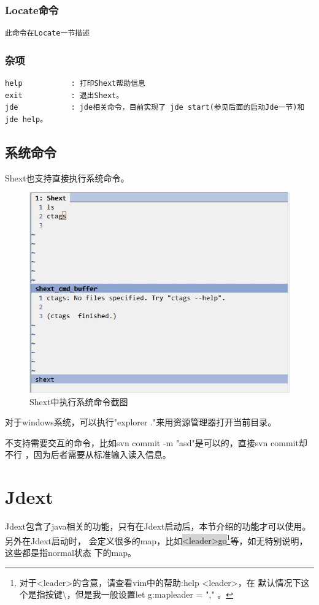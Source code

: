 \documentclass[oneside,openany]{book}
\begin{document}
\subsubsection{Locate命令}
\begin{verbatim}
此命令在Locate一节描述
\end{verbatim}

\subsubsection{杂项}
\begin{verbatim}
help           : 打印Shext帮助信息
exit           : 退出Shext。
jde            : jde相关命令，目前实现了 jde start(参见后面的启动Jde一节)和jde help。
\end{verbatim}

\subsection{系统命令}
  Shext也支持直接执行系统命令。
  \FloatBarrier
  \begin{figure}[H]%
  \centering
  \includegraphics[scale=0.5]{shext-syscmd.jpg}
  \caption{Shext中执行系统命令截图}
  \end{figure}

  对于windows系统，可以执行"explorer ."来用资源管理器打开当前目录。

  不支持需要交互的命令，比如svn commit -m "asd"是可以的，直接svn commit却不行 ，因为后者需要从标准输入读入信息。

\section{Jdext}
  Jdext包含了java相关的功能，只有在Jdext启动后，本节介绍的功能才可以使用。另外在Jdext启动时，
会定义很多的map，比如\colorbox{lightgray}{<leader>go}\footnote{对于<leader>的含意，请查看vim中的帮助:help <leader>，在
默认情况下这个是指按键\textbackslash，但是我一般设置let g:mapleader = "," 。}等，如无特别说明，这些都是指normal状态
下的map。
\end{document}
